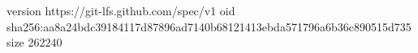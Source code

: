 version https://git-lfs.github.com/spec/v1
oid sha256:aa8a24bdc39184117d87896ad7140b68121413ebda571796a6b36c890515d735
size 262240

